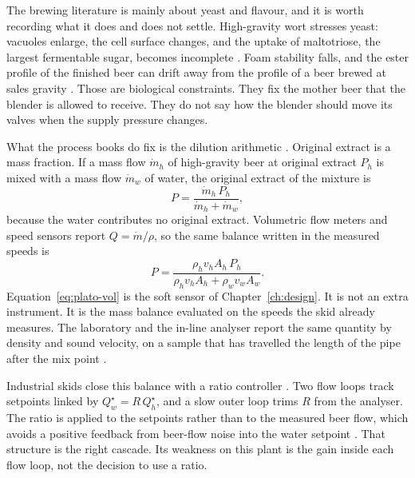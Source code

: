 The brewing literature is mainly about yeast and flavour, and it is worth recording what it does and does not settle. High-gravity wort stresses yeast: vacuoles enlarge, the cell surface changes, and the uptake of maltotriose, the largest fermentable sugar, becomes incomplete \cite{stewart2010highgravity,boulton2001yeast,casey1984highgravity}. Foam stability falls, and the ester profile of the finished beer can drift away from the profile of a beer brewed at sales gravity \cite{stewart2010highgravity,briggs2004brewing}. Those are biological constraints. They fix the mother beer that the blender is allowed to receive. They do not say how the blender should move its valves when the supply pressure changes.

What the process books do fix is the dilution arithmetic \cite{kunze2014brewing,mebak2013wort,ebcanalytica}. Original extract is a mass fraction. If a mass flow $\dot{m}_h$ of high-gravity beer at original extract $P_h$ is mixed with a mass flow $\dot{m}_w$ of water, the original extract of the mixture is
\begin{equation}
\label{eq:plato-mass}
P = \frac{\dot{m}_h\, P_h}{\dot{m}_h + \dot{m}_w},
\end{equation}
because the water contributes no original extract. Volumetric flow meters and speed sensors report $Q = \dot{m}/\rho$, so the same balance written in the measured speeds is
\begin{equation}
\label{eq:plato-vol}
P = \frac{\rho_h v_h A_h\, P_h}{\rho_h v_h A_h + \rho_w v_w A_w}.
\end{equation}
Equation~\eqref{eq:plato-vol} is the soft sensor of Chapter~\ref{ch:design}. It is not an extra instrument. It is the mass balance evaluated on the speeds the skid already measures. The laboratory and the in-line analyser report the same quantity by density and sound velocity, on a sample that has travelled the length of the pipe after the mix point \cite{mebak2013wort,ebcanalytica,baker2016flow}.

Industrial skids close this balance with a ratio controller \cite{shinskey1996process,liptak2006handbook,seborg2016process}. Two flow loops track setpoints linked by $Q_w^\star = R\, Q_h^\star$, and a slow outer loop trims $R$ from the analyser. The ratio is applied to the setpoints rather than to the measured beer flow, which avoids a positive feedback from beer-flow noise into the water setpoint \cite{shinskey1996process}. That structure is the right cascade. Its weakness on this plant is the gain inside each flow loop, not the decision to use a ratio.

